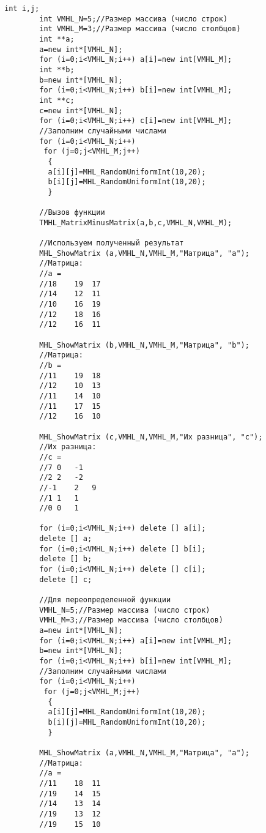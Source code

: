 \documentclass[a4paper,12pt]{article}
\begin{document}
\begin{lstlisting}[label=code_use_TMHL_MatrixMinusMatrix,caption=Пример использования]
        int i,j;
        int VMHL_N=5;//Размер массива (число строк)
        int VMHL_M=3;//Размер массива (число столбцов)
        int **a;
        a=new int*[VMHL_N];
        for (i=0;i<VMHL_N;i++) a[i]=new int[VMHL_M];
        int **b;
        b=new int*[VMHL_N];
        for (i=0;i<VMHL_N;i++) b[i]=new int[VMHL_M];
        int **c;
        c=new int*[VMHL_N];
        for (i=0;i<VMHL_N;i++) c[i]=new int[VMHL_M];
        //Заполним случайными числами
        for (i=0;i<VMHL_N;i++)
         for (j=0;j<VMHL_M;j++)
          {
          a[i][j]=MHL_RandomUniformInt(10,20);
          b[i][j]=MHL_RandomUniformInt(10,20);
          }

        //Вызов функции
        TMHL_MatrixMinusMatrix(a,b,c,VMHL_N,VMHL_M);

        //Используем полученный результат
        MHL_ShowMatrix (a,VMHL_N,VMHL_M,"Матрица", "a");
        //Матрица:
        //a =
        //18	19	17
        //14	12	11
        //10	16	19
        //12	18	16
        //12	16	11

        MHL_ShowMatrix (b,VMHL_N,VMHL_M,"Матрица", "b");
        //Матрица:
        //b =
        //11	19	18
        //12	10	13
        //11	14	10
        //11	17	15
        //12	16	10

        MHL_ShowMatrix (c,VMHL_N,VMHL_M,"Их разница", "c");
        //Их разница:
        //c =
        //7	0	-1
        //2	2	-2
        //-1	2	9
        //1	1	1
        //0	0	1

        for (i=0;i<VMHL_N;i++) delete [] a[i];
        delete [] a;
        for (i=0;i<VMHL_N;i++) delete [] b[i];
        delete [] b;
        for (i=0;i<VMHL_N;i++) delete [] c[i];
        delete [] c;

        //Для переопределенной функции
        VMHL_N=5;//Размер массива (число строк)
        VMHL_M=3;//Размер массива (число столбцов)
        a=new int*[VMHL_N];
        for (i=0;i<VMHL_N;i++) a[i]=new int[VMHL_M];
        b=new int*[VMHL_N];
        for (i=0;i<VMHL_N;i++) b[i]=new int[VMHL_M];
        //Заполним случайными числами
        for (i=0;i<VMHL_N;i++)
         for (j=0;j<VMHL_M;j++)
          {
          a[i][j]=MHL_RandomUniformInt(10,20);
          b[i][j]=MHL_RandomUniformInt(10,20);
          }

        MHL_ShowMatrix (a,VMHL_N,VMHL_M,"Матрица", "a");
        //Матрица:
        //a =
        //11	18	11
        //19	14	15
        //14	13	14
        //19	13	12
        //19	15	10


\end{lstlisting}
\end{document}
